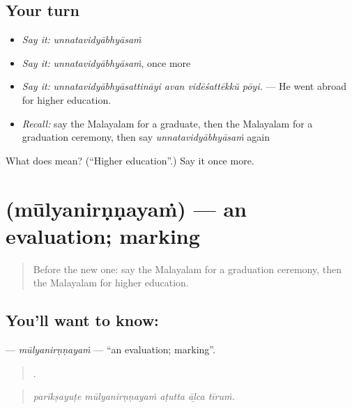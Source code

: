 \subsection*{Your turn}
\begin{itemize}
\raggedright
  \item \emph{Say it:} \emph{unnatavidyābhyāsaṁ}
  \item \emph{Say it:} \emph{unnatavidyābhyāsaṁ}, once more
  \item \emph{Say it:} \emph{unnatavidyābhyāsattināyi avan vidēśattēkkŭ pōyi.} — He went abroad for higher education.
  \item \emph{Recall:} say the Malayalam for a graduate, then the Malayalam for a graduation ceremony, then say \emph{unnatavidyābhyāsaṁ} again
\end{itemize}

\begin{tcolorbox}[breakable,colback=teal!4,colframe=teal!35!black,title={Before you move on}]
What does  mean? (\textquotedblleft{}Higher education\textquotedblright{}.) Say it once more.
\end{tcolorbox}
\section[\texorpdfstring{\ml{മൂല്യനിർണ്ണയം} (mūlyanirṇṇayaṁ)}{മൂല്യനിർണ്ണയം (mūlyanirṇṇayaṁ)}]{ (mūlyanirṇṇayaṁ) — an evaluation; marking}

\label{lesson:ML-C435-mulyanirnnayam}



\begin{quote}
Before the new one: say the Malayalam for a graduation ceremony, then the Malayalam for higher education.
\end{quote}

\subsection*{You'll want to know: }
\textbf{} — \emph{mūlyanirṇṇayaṁ} — \textquotedblleft{}an evaluation; marking\textquotedblright{}.

\begin{quote}
    .
\end{quote}

\begin{quote}
\emph{parīkṣayuṭe mūlyanirṇṇayaṁ aṭutta āḻca tīruṁ.}
\end{quote}

